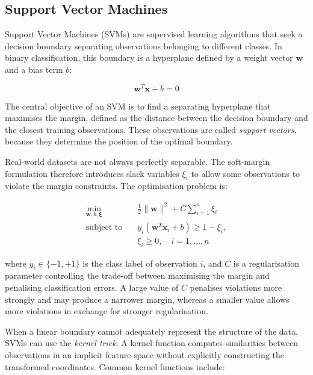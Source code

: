\subsection{Support Vector Machines}

Support Vector Machines (SVMs) are supervised learning algorithms that seek a decision boundary separating observations belonging to different classes. In binary classification, this boundary is a hyperplane defined by a weight vector $\mathbf{w}$ and a bias term $b$:

\begin{equation}
\mathbf{w}^{T}\mathbf{x}+b=0
\label{eq:svm_hyperplane}
\end{equation}

The central objective of an SVM is to find a separating hyperplane that maximises the margin, defined as the distance between the decision boundary and the closest training observations. These observations are called \emph{support vectors}, because they determine the position of the optimal boundary.

Real-world datasets are not always perfectly separable. The soft-margin formulation therefore introduces slack variables $\xi_i$ to allow some observations to violate the margin constraints. The optimisation problem is:

\begin{equation}
\begin{aligned}
\min_{\mathbf{w},b,\boldsymbol{\xi}}\quad
& \frac{1}{2}\|\mathbf{w}\|^2
+ C\sum_{i=1}^{n}\xi_i\\
\text{subject to}\quad
& y_i(\mathbf{w}^{T}\mathbf{x}_i+b)
\geq 1-\xi_i,\\
& \xi_i\geq 0,\quad i=1,\ldots,n
\end{aligned}
\label{eq:svm_optimization}
\end{equation}

where $y_i\in\{-1,+1\}$ is the class label of observation $i$, and $C$ is a regularisation parameter controlling the trade-off between maximising the margin and penalising classification errors. A large value of $C$ penalises violations more strongly and may produce a narrower margin, whereas a smaller value allows more violations in exchange for stronger regularisation.

When a linear boundary cannot adequately represent the structure of the data, SVMs can use the \emph{kernel trick}. A kernel function computes similarities between observations in an implicit feature space without explicitly constructing the transformed coordinates. Common kernel functions include:

